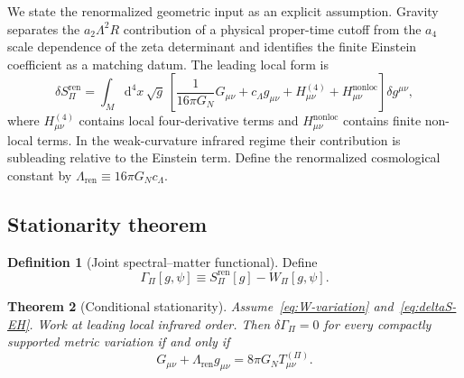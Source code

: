 \documentclass[12pt,a4paper]{article}
\newtheorem{theorem}{Theorem}[section]
\theoremstyle{definition}
\newtheorem{definition}[theorem]{Definition}
\newcommand{\Spi}{S_{\Pi}}
\newcommand{\dd}{\mathrm{d}}
\begin{document}
      We state the renormalized geometric input as an explicit assumption.
      Gravity~\cite{Beau2026h} separates the $a_2\Lambda^2R$ contribution of a physical proper-time cutoff from the
      $a_4$ scale dependence of the zeta determinant and identifies the finite Einstein coefficient as a matching
      datum.
      The leading local form is
      \begin{equation}
        \delta\Spi^{\mathrm{ren}}
        =\int_M\dd^4x\,\sqrt{g}\,
        \left[
          \frac{1}{16\pi G_N}G_{\mu\nu}
          +c_\Lambda g_{\mu\nu}
          +H_{\mu\nu}^{(4)}+H_{\mu\nu}^{\mathrm{nonloc}}
        \right]\delta g^{\mu\nu},
        \label{eq:deltaS-EH}
      \end{equation}
      where $H_{\mu\nu}^{(4)}$ contains local four-derivative terms and
      $H_{\mu\nu}^{\mathrm{nonloc}}$ contains finite non-local terms.
      In the weak-curvature infrared regime their contribution is subleading relative to the Einstein term.
      Define the renormalized cosmological constant by
      $\Lambda_{\mathrm{ren}}\equiv16\pi G_Nc_\Lambda$.

    \subsection{Stationarity theorem}

      \begin{definition}[Joint spectral--matter functional]
        \label{def:equilibrium}
        Define
        \begin{equation}
          \Gamma_\Pi[g,\psi]
          \equiv
          \Spi^{\mathrm{ren}}[g]-W_\Pi[g,\psi].
          \label{eq:F-functional}
        \end{equation}
      \end{definition}

      \begin{theorem}[Conditional stationarity]
        \label{thm:einstein}
        Assume~\eqref{eq:W-variation} and~\eqref{eq:deltaS-EH}.
        Work at leading local infrared order.
        Then $\delta\Gamma_\Pi=0$ for every compactly supported metric variation if and only if
        \begin{equation}
          G_{\mu\nu}+\Lambda_{\mathrm{ren}}g_{\mu\nu}
          =8\pi G_N T^{(\Pi)}_{\mu\nu}.
          \label{eq:einstein}
        \end{equation}
      \end{theorem}
\end{document}
